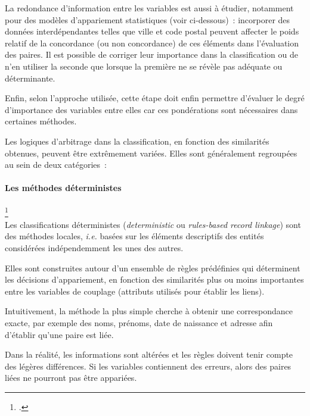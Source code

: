\documentclass[a4paper,12pt,twoside]{book}
\begin{document}
			    La redondance d'information entre les variables est aussi à étudier, notamment pour des modèles d'appariement statistiques (voir ci-dessous)~: incorporer des données interdépendantes telles que ville et code postal peuvent affecter le poids relatif de la concordance (ou non concordance) de ces éléments dans l'évaluation des paires. Il est possible de corriger leur importance dans la classification ou de n'en utiliser la seconde que lorsque la première ne se révèle pas adéquate ou déterminante.
			    
			    Enfin, selon l'approche utilisée, cette étape doit enfin permettre d'évaluer le degré d'importance des variables entre elles car ces pondérations sont nécessaires dans certaines méthodes.
			    
			    \newpage
			    
			    Les logiques d'arbitrage dans la classification, en fonction des similarités obtenues, peuvent être extrêmement variées. Elles sont généralement regroupées au sein de deux catégories~:
			    
			    \paragraph{Les \textbf{méthodes déterministes}}\footcite[Voir des exemples dans le domaine de la santé~:][]{arielRecordLinkageHealth2015} \\
			    
			        Les classifications déterministes (\textit{deterministic} ou \textit{rules-based record linkage}) sont des méthodes \og{}locales\fg{}, \textit{i.e.} basées sur les éléments descriptifs des entités considérées indépendemment les unes des autres.
			        
			        Elles sont construites autour d'un ensemble de règles prédéfinies qui déterminent les décisions d'appariement, en fonction des similarités plus ou moins importantes entre les variables de couplage (attributs utilisés pour établir les liens).
			        
			        Intuitivement, la méthode la plus simple cherche à obtenir une correspondance exacte, par exemple des noms, prénoms, date de naissance et adresse afin d'établir qu'une paire est liée.
			        
			        Dans la réalité, les informations sont altérées et les règles doivent tenir compte des légères différences. Si les variables contiennent des erreurs, alors des paires liées ne pourront pas être appariées.
			        
\end{document}
